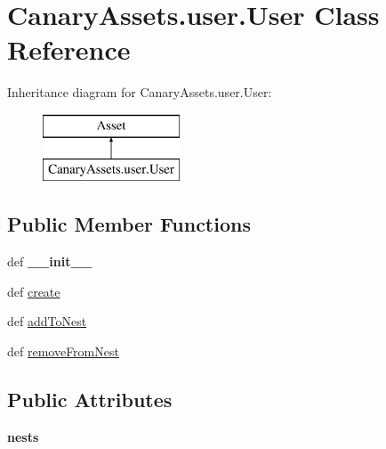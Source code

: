 \hypertarget{class_canary_assets_1_1user_1_1_user}{\section{Canary\-Assets.\-user.\-User Class Reference}
\label{class_canary_assets_1_1user_1_1_user}
}
Inheritance diagram for Canary\-Assets.\-user.\-User\-:\begin{figure}[H]
\begin{center}
\leavevmode
\includegraphics[height=2.000000cm]{class_canary_assets_1_1user_1_1_user}
\end{center}
\end{figure}
\subsection*{Public Member Functions}
\begin{DoxyCompactItemize}
\item 
\hypertarget{class_canary_assets_1_1user_1_1_user_a8b87b525ca351b1b8717f37c7c0c5a35}{def {\bfseries \-\_\-\-\_\-init\-\_\-\-\_\-}}\label{class_canary_assets_1_1user_1_1_user_a8b87b525ca351b1b8717f37c7c0c5a35}

\item 
def \hyperlink{class_canary_assets_1_1user_1_1_user_aca0da8d74c462b822a87d3304d59e47d}{create}
\item 
def \hyperlink{class_canary_assets_1_1user_1_1_user_a10da837d8290cdbefca04251849903a4}{add\-To\-Nest}
\item 
def \hyperlink{class_canary_assets_1_1user_1_1_user_aaf98950ab476b01896c20c35fdd27492}{remove\-From\-Nest}
\end{DoxyCompactItemize}
\subsection*{Public Attributes}
\begin{DoxyCompactItemize}
\item 
\hypertarget{class_canary_assets_1_1user_1_1_user_a18fe5b074e1bb07f063e20535ea3829e}{{\bfseries nests}}\label{class_canary_assets_1_1user_1_1_user_a18fe5b074e1bb07f063e20535ea3829e}

\end{DoxyCompactItemize}



